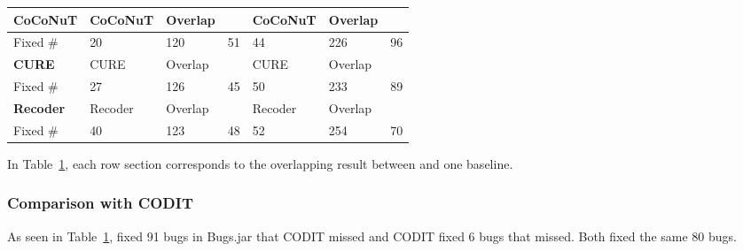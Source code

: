 {{\begin{table}[t]
\begin{center}
\begin{tabular}{p{1cm}<{\centering}|p{0.9cm}<{\centering}|p{1cm}<{\centering}|p{0.7cm}<{\centering}|p{0.9cm}<{\centering}|p{0.8cm}<{\centering}|p{0.7cm}<{\centering}}
			\hline
			{\bf CoCoNuT}             & CoCoNuT   & Overlap   & \tool  & CoCoNuT   & Overlap   & \tool \\
			\hline
			Fixed \#     & \cellcolor{mygray} 20  & 120   & \cellcolor{mygray} 51 & \cellcolor{mygray}44 &  226  & \cellcolor{mygray} 96\\
			\hline
			{\bf CURE}             & CURE   & Overlap   & \tool  & CURE   & Overlap   & \tool \\
			\hline
			Fixed \#     & \cellcolor{mygray} 27  &  126  & \cellcolor{mygray} 45 & \cellcolor{mygray} 50&  233  & \cellcolor{mygray} 89\\
                      	\hline
			{\bf Recoder}             & Recoder   & Overlap   & \tool  & Recoder   & Overlap   & \tool \\
			\hline
			Fixed \#     & \cellcolor{mygray} 40  &  123  & \cellcolor{mygray} 48 & \cellcolor{mygray} 52 &  254  & \cellcolor{mygray} 70\\
			\hline
		\end{tabular}
		\label{RQ3_results}
	\end{center}
\end{table}
}}

In Table~\ref{RQ3_results}, each row section corresponds to the
overlapping result between {\tool} and one baseline.

\subsubsection{{\bf Comparison with CODIT}}

As seen in Table~\ref{RQ3_results}, {\tool} fixed 91 bugs in Bugs.jar
that CODIT missed and CODIT fixed 6 bugs that {\tool} missed. Both fixed the same 80 bugs.


